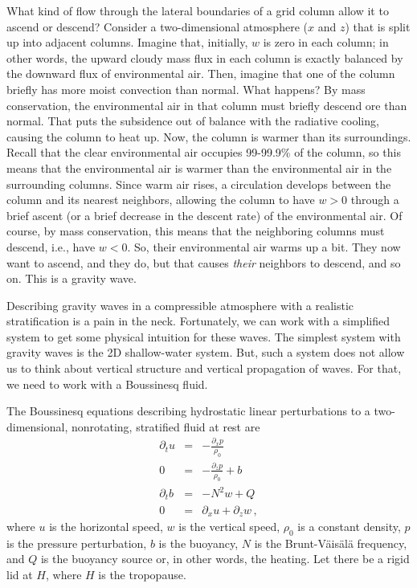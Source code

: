 \documentclass[12pt]{article}
\begin{document}
What kind of flow through the lateral boundaries of a grid column allow it to ascend or descend?  Consider a two-dimensional atmosphere ($x$ and $z$) that is split up into adjacent columns.  Imagine that, initially, $w$ is zero in each column; in other words, the upward cloudy mass flux in each column is exactly balanced by the downward flux of environmental air.  Then, imagine that one of the column briefly has more moist convection than normal.  What happens?  By mass conservation, the environmental air in that column must briefly descend ore than normal.  That puts the subsidence out of balance with the radiative cooling, causing the column to heat up.  Now, the column is warmer than its surroundings.  Recall that the clear environmental air occupies 99-99.9\% of the column, so this means that the environmental air is warmer than the environmental air in the surrounding columns.  Since warm air rises, a circulation develops between the column and its nearest neighbors, allowing the column to have $w > 0$ through a brief ascent (or a brief decrease in the descent rate) of the environmental air.  Of course, by mass conservation, this means that the neighboring columns must descend, i.e., have $w < 0$.  So, their environmental air warms up a bit.  They now want to ascend, and they do, but that causes {\it their} neighbors to descend, and so on.  This is a gravity wave.


Describing gravity waves in a compressible atmosphere with a realistic stratification is a pain in the neck.  Fortunately, we can work with a simplified system to get some physical intuition for these waves.  The simplest system with gravity waves is the 2D shallow-water system.  But, such a system does not allow us to think about vertical structure and vertical propagation of waves.  For that, we need to work with a Boussinesq fluid.


The Boussinesq equations describing hydrostatic linear perturbations to a two-dimensional, nonrotating, stratified fluid at rest are
\begin{subequations}\label{2dbouss_eqns}
\begin{eqnarray}
\partial_t u &=& -\frac{\partial_x p}{\rho_0}  \label{hmom}  \\
0 &=& -\frac{\partial_z p}{\rho_0} + b  \label{vmom}  \\
\partial_t b &=& -N^2 w + Q \label{therm}  \\
0 &=& \partial_x u + \partial_z w \, , \label{cont}
\end{eqnarray}
\end{subequations}
where $u$ is the horizontal speed, $w$ is the vertical speed, $\rho_0$ is a constant density, $p$ is the pressure perturbation, $b$ is the buoyancy, $N$ is the Brunt-V\"ais\"al\"a frequency, and $Q$ is the buoyancy source or, in other words, the heating.  Let there be a rigid lid at $H$, where $H$ is the tropopause.
\end{document}
